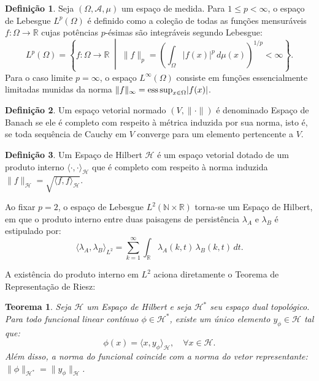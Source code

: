 \documentclass[12pt, a4paper]{article}
\theoremstyle{plain}
\newtheorem{theorem}{Teorema}[section]
\theoremstyle{definition}
\newtheorem{definition}{Definição}[section]
\theoremstyle{remark}
\begin{document}
\begin{definition}
Seja $(\Omega, \mathcal{A}, \mu)$ um espaço de medida. Para $1 \le p < \infty$, o espaço de Lebesgue $L^p(\Omega)$ é definido como a coleção de todas as funções mensuráveis $f: \Omega \to \mathbb{R}$ cujas potências $p$-ésimas são integráveis segundo Lebesgue:
\begin{equation*}
L^p(\Omega) = \left\{ f: \Omega \to \mathbb{R} \;\middle|\; \|f\|_p = \left( \int_{\Omega} |f(x)|^p \, d\mu(x) \right)^{1/p} < \infty \right\}.
\end{equation*}
Para o caso limite $p = \infty$, o espaço $L^\infty(\Omega)$ consiste em funções essencialmente limitadas munidas da norma $\|f\|_\infty = \text{ess\,sup}_{x \in \Omega} |f(x)|$.
\end{definition}

\begin{definition}
Um espaço vetorial normado $(V, \|\cdot\|)$ é denominado Espaço de Banach se ele é completo com respeito à métrica induzida por sua norma, isto é, se toda sequência de Cauchy em $V$ converge para um elemento pertencente a $V$.
\end{definition}

\begin{definition}
Um Espaço de Hilbert $\mathcal{H}$ é um espaço vetorial dotado de um produto interno $\langle \cdot, \cdot \rangle_{\mathcal{H}}$ que é completo com respeito à norma induzida $\|f\|_{\mathcal{H}} = \sqrt{\langle f, f \rangle_{\mathcal{H}}}$.
\end{definition}

Ao fixar $p = 2$, o espaço de Lebesgue $L^2(\mathbb{N} \times \mathbb{R})$ torna-se um Espaço de Hilbert, em que o produto interno entre duas paisagens de persistência $\lambda_A$ e $\lambda_B$ é estipulado por:
\begin{equation*}
\langle \lambda_A, \lambda_B \rangle_{L^2} = \sum_{k=1}^{\infty} \int_{\mathbb{R}} \lambda_A(k, t) \, \lambda_B(k, t) \, dt.
\end{equation*}

A existência do produto interno em $L^2$ aciona diretamente o Teorema de Representação de Riesz:

\begin{theorem}
Seja $\mathcal{H}$ um Espaço de Hilbert e seja $\mathcal{H}^*$ seu espaço dual topológico. Para todo funcional linear contínuo $\phi \in \mathcal{H}^*$, existe um único elemento $y_{\phi} \in \mathcal{H}$ tal que:
\begin{equation*}
\phi(x) = \langle x, y_{\phi} \rangle_{\mathcal{H}}, \quad \forall x \in \mathcal{H}.
\end{equation*}
Além disso, a norma do funcional coincide com a norma do vetor representante: $\|\phi\|_{\mathcal{H}^*} = \|y_{\phi}\|_{\mathcal{H}}$.
\end{theorem}
\end{document}
